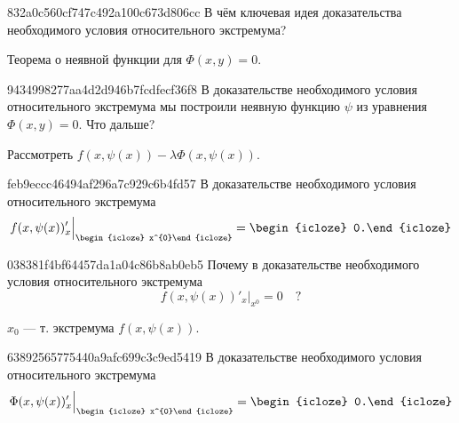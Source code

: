 \begin{note}{832a0c560cf747c492a100c673d806cc}
    В чём ключевая идея доказательства необходимого условия относительного экстремума?

    \begin{cloze}{1}
        Теорема о неявной функции для \({ \Phi(x, y) = 0 }\).
    \end{cloze}
\end{note}

\begin{note}{9434998277aa4d2d946b7fcdfecf36f8}
    В доказательстве необходимого условия относительного экстремума мы построили неявную функцию \({ \psi }\) из уравнения \({ \Phi(x, y) = 0 }\).
    Что дальше?

    \begin{cloze}{1}
        Рассмотреть \({ f(x, \psi(x)) - \lambda \Phi(x, \psi(x)) }\).
    \end{cloze}
\end{note}

\begin{note}{feb9eccc46494af296a7c929c6b4fd57}
    В доказательстве необходимого условия относительного экстремума
    \[
        f(x, \psi(x))'_{x} \Big|_{\begin{icloze}{2}x^{0}\end{icloze}} = \begin{icloze}{1}0.\end{icloze}
    \]
\end{note}

\begin{note}{038381f4bf64457da1a04c86b8ab0eb5}
    Почему в доказательстве необходимого условия относительного экстремума
    \[
        f(x, \psi(x))'_{x} \Big|_{x^{0}} = 0 \quad \text{?}
    \]

    \begin{cloze}{1}
        \({ x_{0} }\) --- т. экстремума \({ f(x, \psi(x)) }\).
    \end{cloze}
\end{note}

\begin{note}{63892565775440a9afc699c3c9ed5419}
    В доказательстве необходимого условия относительного экстремума
    \[
        \Phi(x, \psi(x))'_{x} \Big|_{\begin{icloze}{2}x^{0}\end{icloze}} = \begin{icloze}{1}0.\end{icloze}
    \]
\end{note}

